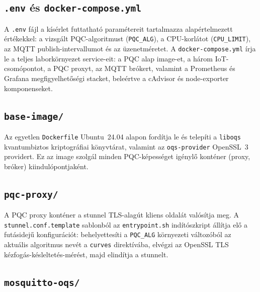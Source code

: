 \subsection*{\texttt{.env} és \texttt{docker-compose.yml}}

A \texttt{.env} fájl a kísérlet futtatható paramétereit tartalmazza alapértelmezett értékekkel: a vizsgált PQC-algoritmust (\texttt{PQC\_ALG}), a CPU-korlátot (\texttt{CPU\_LIMIT}), az MQTT publish-intervallumot és az üzenetméretet. A \texttt{docker-compose.yml} írja le a teljes laborkörnyezet service-eit: a PQC alap image-et, a három IoT-csomópontot, a PQC proxyt, az MQTT brókert, valamint a Prometheus és Grafana megfigyelhetőségi stacket, beleértve a cAdvisor és node-exporter komponenseket.

\subsection*{\texttt{base-image/}}

Az egyetlen \texttt{Dockerfile} Ubuntu~24.04 alapon fordítja le és telepíti a \texttt{liboqs} kvantumbiztos kriptográfiai könyvtárat, valamint az \texttt{oqs-provider} OpenSSL~3 providert. Ez az image szolgál minden PQC-képességet igénylő konténer (proxy, bróker) kiindulópontjaként.

\subsection*{\texttt{pqc-proxy/}}

A PQC proxy konténer a stunnel TLS-alagút kliens oldalát valósítja meg. A \texttt{stunnel.conf.template} sablonból az \texttt{entrypoint.sh} indítószkript állítja elő a futásidejű konfigurációt: behelyettesíti a \texttt{PQC\_ALG} környezeti változóból az aktuális algoritmus nevét a \texttt{curves} direktívába, elvégzi az OpenSSL TLS kézfogás-késleltetés-mérést, majd elindítja a stunnelt.

\subsection*{\texttt{mosquitto-oqs/}}

